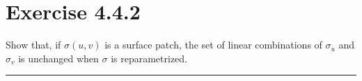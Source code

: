 \documentclass[12pt]{article}
\begin{document}
\maketitle

\section*{Exercise 4.4.2}
\indent

Show that, if $\sigma(u,v)$ is a surface patch, the set of linear combinations of $\sigma_u$ and $\sigma_v$ is unchanged when $\sigma$ is reparametrized.

\vspace{1cm}
\hrule
\vspace{1cm}
\noindent
\end{document}
